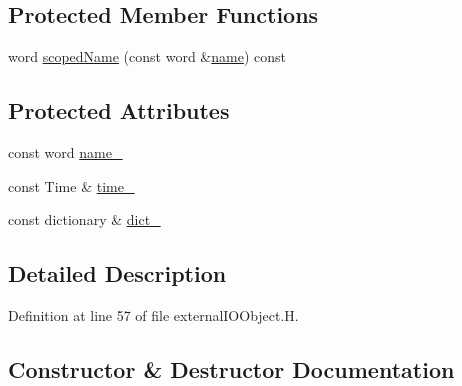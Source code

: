 \subsection*{Protected Member Functions}
\begin{DoxyCompactItemize}
\item 
word \hyperlink{classFoam_1_1externalIOObject_1_1externalIOObject_ac3a973c5f3a4a245b475cf4fc6de864a}{scoped\+Name} (const word \&\hyperlink{classFoam_1_1externalIOObject_1_1externalIOObject_ade4113569ef0db70665fded275a5e38e}{name}) const
\end{DoxyCompactItemize}
\subsection*{Protected Attributes}
\begin{DoxyCompactItemize}
\item 
const word \hyperlink{classFoam_1_1externalIOObject_1_1externalIOObject_afd780271a9c45061cfdc62f5c3fc9929}{name\+\_\+}
\item 
const Time \& \hyperlink{classFoam_1_1externalIOObject_1_1externalIOObject_a1372c16310f0a7cbeaf8b4c0cfc9363b}{time\+\_\+}
\item 
const dictionary \& \hyperlink{classFoam_1_1externalIOObject_1_1externalIOObject_a892ddcb9cba6f50b0396cdb7bf1b4f6a}{dict\+\_\+}
\end{DoxyCompactItemize}


\subsection{Detailed Description}


Definition at line 57 of file external\+I\+O\+Object.\+H.



\subsection{Constructor \& Destructor Documentation}
\mbox{\label{classFoam_1_1externalIOObject_1_1externalIOObject_a634c9c39a496123d761ec4b0fec244ac}} 
